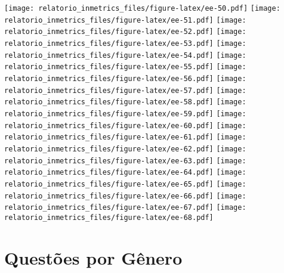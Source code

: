 \documentclass[]{book}
\begin{document}
\texttt{[image: relatorio\_inmetrics\_files/figure-latex/ee-50.pdf]} \texttt{[image: relatorio\_inmetrics\_files/figure-latex/ee-51.pdf]} \texttt{[image: relatorio\_inmetrics\_files/figure-latex/ee-52.pdf]} \texttt{[image: relatorio\_inmetrics\_files/figure-latex/ee-53.pdf]} \texttt{[image: relatorio\_inmetrics\_files/figure-latex/ee-54.pdf]} \texttt{[image: relatorio\_inmetrics\_files/figure-latex/ee-55.pdf]} \texttt{[image: relatorio\_inmetrics\_files/figure-latex/ee-56.pdf]} \texttt{[image: relatorio\_inmetrics\_files/figure-latex/ee-57.pdf]} \texttt{[image: relatorio\_inmetrics\_files/figure-latex/ee-58.pdf]} \texttt{[image: relatorio\_inmetrics\_files/figure-latex/ee-59.pdf]} \texttt{[image: relatorio\_inmetrics\_files/figure-latex/ee-60.pdf]} \texttt{[image: relatorio\_inmetrics\_files/figure-latex/ee-61.pdf]} \texttt{[image: relatorio\_inmetrics\_files/figure-latex/ee-62.pdf]} \texttt{[image: relatorio\_inmetrics\_files/figure-latex/ee-63.pdf]} \texttt{[image: relatorio\_inmetrics\_files/figure-latex/ee-64.pdf]} \texttt{[image: relatorio\_inmetrics\_files/figure-latex/ee-65.pdf]} \texttt{[image: relatorio\_inmetrics\_files/figure-latex/ee-66.pdf]} \texttt{[image: relatorio\_inmetrics\_files/figure-latex/ee-67.pdf]} \texttt{[image: relatorio\_inmetrics\_files/figure-latex/ee-68.pdf]}

\hypertarget{questoes-por-genero}{%
\section{Questões por Gênero}\label{questoes-por-genero}}
\end{document}
